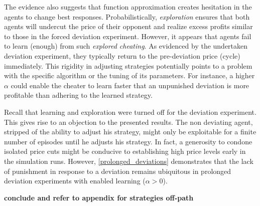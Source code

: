 The evidence also suggests that function approximation creates hesitation in the agents to change best responses. Probabilistically, \emph{exploration} ensures that both agents will undercut the price of their opponent and realize excess profits similar to those in the forced deviation experiment. However, it appears that agents fail to learn (enough) from such \emph{explored cheating}. As evidenced by the undertaken deviation experiment, they typically return to the pre-deviation price (cycle) immediately. This rigidity in adjusting strategies potentially points to a problem with the specific algorithm or the tuning of its parameters. For instance, a higher $\alpha$ could enable the cheater to learn faster that an unpunished deviation is more profitable than adhering to the learned strategy. 

Recall that learning and exploration were turned off for the deviation experiment. This gives rise to an objection to the presented results. The non deviating agent, stripped of the ability to adjust his strategy, might only be exploitable for a finite number of episodes until he adjusts his strategy. In fact, a generosity to condone isolated price cuts might be conducive to establishing high price levels early in the simulation runs. However, \autoref{prolonged_deviations} demonstrates that the lack of punishment in response to a deviation remains ubiquitous in prolonged deviation experiments with enabled learning ($\alpha > 0$).

\textbf{conclude and refer to appendix for strategies off-path}
